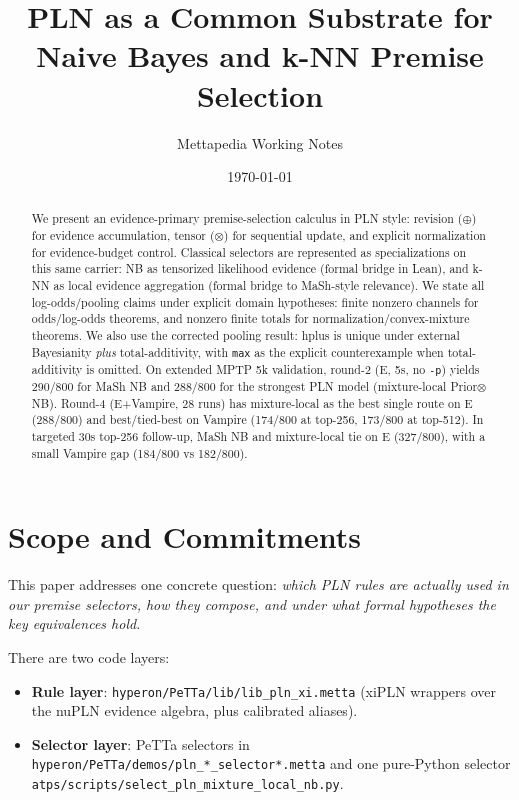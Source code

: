 \documentclass[11pt]{article}
\title{PLN as a Common Substrate for Naive Bayes and k-NN Premise Selection}
\author{Mettapedia Working Notes}
\date{\today}
\newcommand{\lpath}[1]{\texttt{\nolinkurl{#1}}}
\newcommand{\lid}[1]{{\ttfamily\nolinkurl{#1}}}
\begin{document}
\maketitle

\begin{abstract}
We present an evidence-primary premise-selection calculus in PLN style:
revision (\(\oplus\)) for evidence accumulation, tensor (\(\otimes\)) for
sequential update, and explicit normalization for evidence-budget control.
Classical selectors are represented as specializations on this same carrier:
NB as tensorized likelihood evidence (formal bridge in Lean), and k-NN as
local evidence aggregation (formal bridge to MaSh-style relevance).
We state all log-odds/pooling claims under explicit domain hypotheses:
finite nonzero channels for odds/log-odds theorems, and nonzero finite totals for
normalization/convex-mixture theorems. We also use the corrected pooling result:
hplus is unique under external Bayesianity \emph{plus} total-additivity, with
\lid{max} as the explicit counterexample when total-additivity is omitted.
On extended MPTP 5k validation, round-2 (E, 5s, no \texttt{-p}) yields
290/800 for MaSh NB and 288/800 for the strongest PLN model
(mixture-local Prior\(\otimes\)NB). Round-4 (E+Vampire, 28 runs) has
mixture-local as the best single route on E (288/800) and best/tied-best on
Vampire (174/800 at top-256, 173/800 at top-512). In targeted 30s top-256
follow-up, MaSh NB and mixture-local tie on E (327/800), with a small Vampire
gap (184/800 vs 182/800).
\end{abstract}

\section{Scope and Commitments}
This paper addresses one concrete question: \emph{which PLN rules are actually
used in our premise selectors, how they compose, and under what formal
hypotheses the key equivalences hold.}

There are two code layers:
\begin{itemize}
\item \textbf{Rule layer}: \lpath{hyperon/PeTTa/lib/lib_pln_xi.metta}
      (xiPLN wrappers over the nuPLN evidence algebra, plus calibrated aliases).
\item \textbf{Selector layer}: PeTTa selectors in
      \lpath{hyperon/PeTTa/demos/pln_*_selector*.metta} and one
      pure-Python selector \lpath{atps/scripts/select_pln_mixture_local_nb.py}.
\end{itemize}
\end{document}
